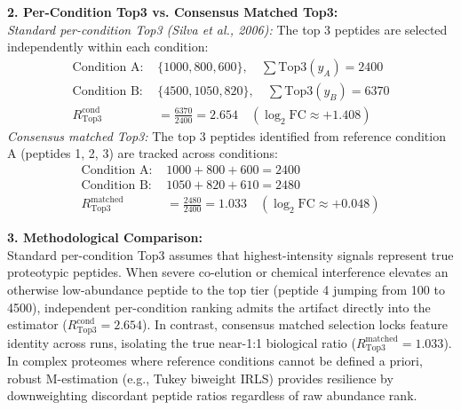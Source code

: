 \documentclass[11pt,oneside]{book}
\begin{document}
\textbf{2. Per-Condition Top3 vs. Consensus Matched Top3:}\\
\textit{Standard per-condition Top3 (Silva et al., 2006):} The top 3 peptides are selected independently within each condition:
\begin{align*}
\text{Condition A: } & \{1000, 800, 600\}, \quad \sum \text{Top3}(y_A) = 2400 \\
\text{Condition B: } & \{4500, 1050, 820\}, \quad \sum \text{Top3}(y_B) = 6370 \\
R_{\text{Top3}}^{\text{cond}} &= \frac{6370}{2400} = 2.654 \quad (\log_2\text{FC} \approx +1.408)
\end{align*}
\textit{Consensus matched Top3:} The top 3 peptides identified from reference condition A (peptides 1, 2, 3) are tracked across conditions:
\begin{align*}
\text{Condition A: } & 1000 + 800 + 600 = 2400 \\
\text{Condition B: } & 1050 + 820 + 610 = 2480 \\
R_{\text{Top3}}^{\text{matched}} &= \frac{2480}{2400} = 1.033 \quad (\log_2\text{FC} \approx +0.048)
\end{align*}

\textbf{3. Methodological Comparison:}\\
Standard per-condition Top3 assumes that highest-intensity signals represent true proteotypic peptides. When severe co-elution or chemical interference elevates an otherwise low-abundance peptide to the top tier (peptide 4 jumping from 100 to 4500), independent per-condition ranking admits the artifact directly into the estimator ($R_{\text{Top3}}^{\text{cond}} = 2.654$). In contrast, consensus matched selection locks feature identity across runs, isolating the true near-1:1 biological ratio ($R_{\text{Top3}}^{\text{matched}} = 1.033$). In complex proteomes where reference conditions cannot be defined a priori, robust M-estimation (e.g., Tukey biweight IRLS) provides resilience by downweighting discordant peptide ratios regardless of raw abundance rank.
\end{document}
